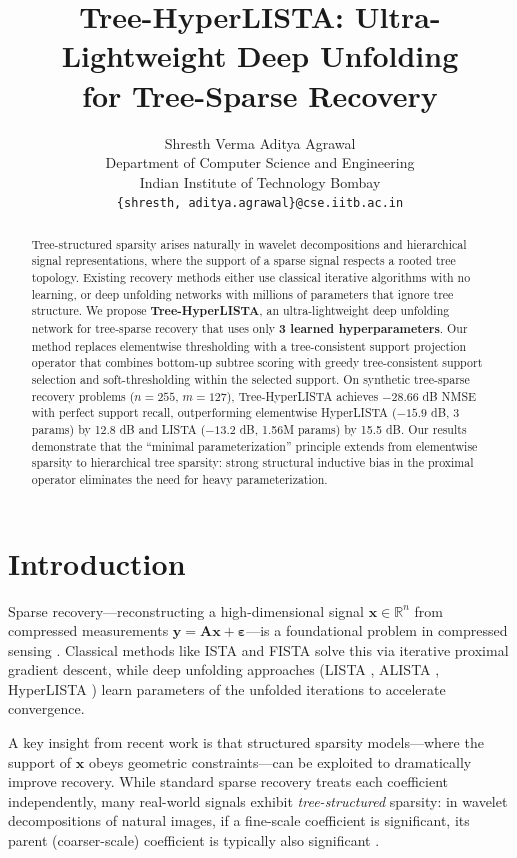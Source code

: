 \documentclass{article}
\title{Tree-HyperLISTA: Ultra-Lightweight Deep Unfolding\\for Tree-Sparse Recovery}
\author{
  Shresth Verma \quad Aditya Agrawal \\
  Department of Computer Science and Engineering\\
  Indian Institute of Technology Bombay\\
  \texttt{\{shresth, aditya.agrawal\}@cse.iitb.ac.in}
}
\begin{document}
\maketitle

\begin{abstract}
Tree-structured sparsity arises naturally in wavelet decompositions and hierarchical signal representations, where the support of a sparse signal respects a rooted tree topology. Existing recovery methods either use classical iterative algorithms with no learning, or deep unfolding networks with millions of parameters that ignore tree structure. We propose \textbf{Tree-HyperLISTA}, an ultra-lightweight deep unfolding network for tree-sparse recovery that uses only \textbf{3 learned hyperparameters}. Our method replaces elementwise thresholding with a tree-consistent support projection operator that combines bottom-up subtree scoring with greedy tree-consistent support selection and soft-thresholding within the selected support. On synthetic tree-sparse recovery problems ($n{=}255$, $m{=}127$), Tree-HyperLISTA achieves $-28.66$ dB NMSE with perfect support recall, outperforming elementwise HyperLISTA ($-15.9$ dB, 3 params) by 12.8 dB and LISTA ($-13.2$ dB, 1.56M params) by 15.5 dB. Our results demonstrate that the ``minimal parameterization'' principle extends from elementwise sparsity to hierarchical tree sparsity: strong structural inductive bias in the proximal operator eliminates the need for heavy parameterization.
\end{abstract}

\section{Introduction}

Sparse recovery---reconstructing a high-dimensional signal $\mathbf{x} \in \mathbb{R}^n$ from compressed measurements $\mathbf{y} = \mathbf{A}\mathbf{x} + \boldsymbol{\varepsilon}$---is a foundational problem in compressed sensing \cite{candes2006rip, donoho2006compressed}. Classical methods like ISTA and FISTA solve this via iterative proximal gradient descent, while deep unfolding approaches (LISTA \cite{gregor2010lista}, ALISTA \cite{liu2019alista}, HyperLISTA \cite{chen2021hyperlista}) learn parameters of the unfolded iterations to accelerate convergence.

A key insight from recent work is that structured sparsity models---where the support of $\mathbf{x}$ obeys geometric constraints---can be exploited to dramatically improve recovery. While standard sparse recovery treats each coefficient independently, many real-world signals exhibit \emph{tree-structured} sparsity: in wavelet decompositions of natural images, if a fine-scale coefficient is significant, its parent (coarser-scale) coefficient is typically also significant \cite{baraniuk2010model, he2011tree}.
\end{document}
